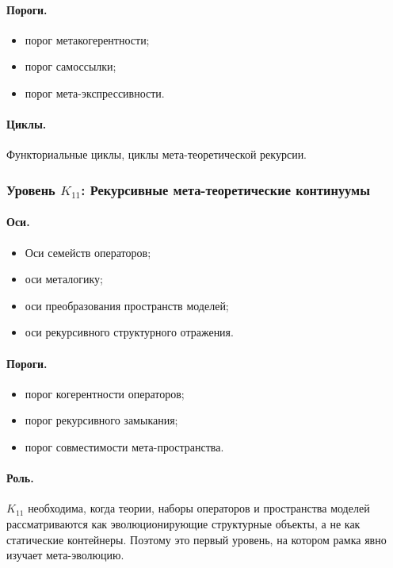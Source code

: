 \paragraph{Пороги.}
\begin{itemize}
    \item порог метакогерентности;
    \item порог самоссылки;
    \item порог мета-экспрессивности.
\end{itemize}

\paragraph{Циклы.}
Функториальные циклы, циклы мета-теоретической рекурсии.

\subsubsection{Уровень \(K_{11}\): Рекурсивные мета-теоретические континуумы}

\paragraph{Оси.}
\begin{itemize}
    \item Оси семейств операторов;
    \item оси металогику;
    \item оси преобразования пространств моделей;
    \item оси рекурсивного структурного отражения.
\end{itemize}

\paragraph{Пороги.}
\begin{itemize}
    \item порог когерентности операторов;
    \item порог рекурсивного замыкания;
    \item порог совместимости мета-пространства.
\end{itemize}

\paragraph{Роль.}
\(K_{11}\) необходима, когда теории, наборы операторов и пространства моделей
рассматриваются как эволюционирующие структурные объекты, а не как статические
контейнеры. Поэтому это первый уровень, на котором рамка явно изучает
мета-эволюцию.

